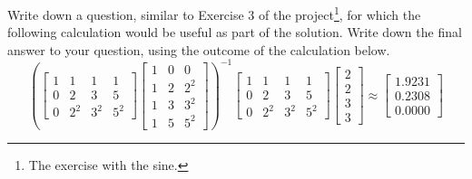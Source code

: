 \documentclass[addpoints]{exam}
\begin{document}
\begin{questions}
\question[25] Write down a question, similar to Exercise 3 of the project\footnote{The exercise with the sine.}, for which the following calculation would be useful as part of the solution. Write down the final answer to your question, using the outcome of the calculation below.
\[\left(
\begin{bmatrix}
1 & 1 & 1 & 1 \\
0 & 2 & 3 & 5 \\
0 & 2^2 & 3^2 & 5^2
\end{bmatrix}
\begin{bmatrix}
1 & 0 & 0\\
1 & 2 & 2^2 \\
1 & 3 & 3^2 \\
1 & 5 & 5^2
\end{bmatrix} \right)^{-1}
\begin{bmatrix}
1 & 1 & 1 & 1 \\
0 & 2 & 3 & 5 \\
0 & 2^2 & 3^2 & 5^2
\end{bmatrix}
\begin{bmatrix}
2\\2\\3\\3
\end{bmatrix} \approx
\begin{bmatrix}
1.9231\\ 0.2308 \\ 0.0000
\end{bmatrix}\]
\end{questions}
\end{document}

